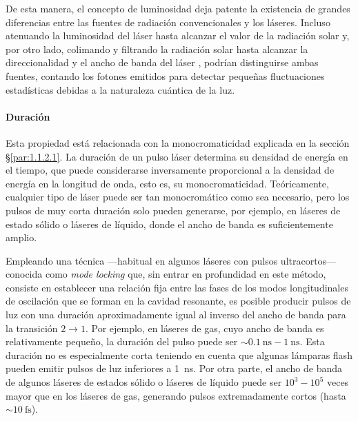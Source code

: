 De esta manera, el concepto de luminosidad deja patente la existencia de grandes diferencias entre las fuentes de radiación convencionales y los láseres. Incluso atenuando la luminosidad del láser  hasta alcanzar el valor de la radiación solar y, por otro lado, colimando y filtrando la radiación solar hasta alcanzar la direccionalidad y el ancho de banda del láser , podrían distinguirse ambas fuentes, contando los fotones emitidos para detectar pequeñas fluctuaciones estadísticas debidas a la naturaleza cuántica de la luz. 

\paragraph{Duración}\label{par:1.1.2.5}
Esta propiedad está relacionada con la monocromaticidad explicada en la sección \S\ref{par:1.1.2.1}. La duración de un pulso láser determina su densidad de energía en el tiempo, que puede considerarse inversamente proporcional a la densidad de energía en la longitud de onda, esto es, su monocromaticidad\autocite{sveltoPrinciplesLasers2010}. Teóricamente, cualquier tipo de láser puede ser tan monocromático como sea necesario, pero los pulsos de muy corta duración solo pueden generarse, por ejemplo, en láseres de estado sólido o láseres de líquido, donde el ancho de banda es suficientemente amplio.

Empleando una técnica ---habitual en algunos láseres con pulsos ultracortos--- conocida como \emph{mode locking} que, sin entrar en profundidad en este método, consiste en establecer una relación fija entre las fases de los modos longitudinales de oscilación que se forman en la cavidad resonante, es posible producir pulsos de luz con una duración aproximadamente igual al inverso del ancho de banda para la transición $2 \rightarrow 1$. Por ejemplo, en láseres de gas, cuyo ancho de banda es relativamente pequeño, la duración del pulso puede ser $\sim\qty{0,1}{\ns}-\qty{1}{\ns}$. Esta duración no es especialmente corta teniendo en cuenta que algunas lámparas flash pueden emitir pulsos de luz inferiores a \qty{1}{\ns}. Por otra parte, el ancho de banda de algunos láseres de estados sólido o láseres de líquido puede ser $10^3-10^5$ veces mayor que en los láseres de gas, generando pulsos extremadamente cortos (hasta $\sim\qty{10}{\fs}$).

